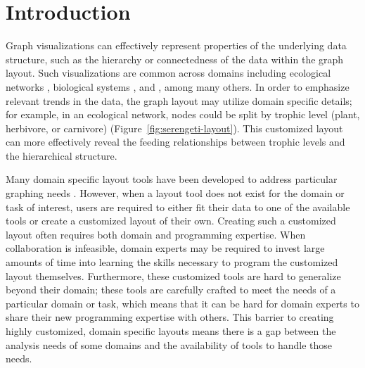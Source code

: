 \section{Introduction}
Graph visualizations can effectively represent properties of the underlying data structure, such as the hierarchy or connectedness of the data within the graph layout. Such visualizations are common across domains including ecological networks \cite{hinke2004visualizing,harper2006dynamic,lavigne1996cod,baskerville2011spatial,yodzis1998local,cohen2003ecological,kearney2016blog,benson2016higher}, biological systems \cite{barsky2008cerebral,shannon2003cytoscape,gehlenborg2010visualization,saraiya2005visualizing,becker2001graph}, and , among many others. In order to emphasize relevant trends in the data, the graph layout may utilize domain specific details; for example, in an ecological network, nodes could be split by trophic level (plant, herbivore, or carnivore) (Figure~\ref{fig:serengeti-layout}). This customized layout can more effectively reveal the feeding relationships between trophic levels and the hierarchical structure.

Many domain specific layout tools have been developed to address particular graphing needs \cite{barsky2008cerebral,shannon2003cytoscape,kearney2017d3,kearney2017ecopath}. However, when a layout tool does not exist for the domain or task of interest, users are required to either fit their data to one of the available tools or create a customized layout of their own. Creating such a customized layout often requires both domain and programming expertise. 
When collaboration is infeasible, domain experts may be required to invest large amounts of time into learning the skills necessary to program the customized layout themselves. Furthermore, these customized tools are hard to generalize beyond their domain; these tools are carefully crafted to meet the needs of a particular domain or task, which means that it can be hard for domain experts to share their new programming expertise with others. This barrier to creating highly customized, domain specific layouts means there is a gap between the analysis needs of some domains and the availability of tools to handle those needs.

